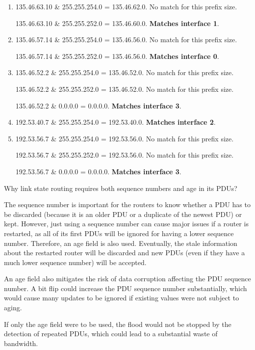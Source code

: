 \begin{Answer}
\begin{enumerate}
\item 135.46.63.10 \& 255.255.254.0 = 135.46.62.0. No match for this prefix size.

135.46.63.10 \& 255.255.252.0 = 135.46.60.0. \textbf{Matches interface 1}.

\item 135.46.57.14 \& 255.255.254.0 = 135.46.56.0. No match for this prefix size.

135.46.57.14 \& 255.255.252.0 = 135.46.56.0. \textbf{Matches interface 0}.

\item 135.46.52.2 \& 255.255.254.0 = 135.46.52.0. No match for this prefix size.

135.46.52.2 \& 255.255.252.0 = 135.46.52.0. No match for this prefix size.

135.46.52.2 \& 0.0.0.0 = 0.0.0.0. \textbf{Matches interface 3}.

\item 192.53.40.7 \& 255.255.254.0 = 192.53.40.0. \textbf{Matches interface 2}.

\item 192.53.56.7 \& 255.255.254.0 = 192.53.56.0. No match for this prefix size.

192.53.56.7 \& 255.255.252.0 = 192.53.56.0. No match for this prefix size.

192.53.56.7 \& 0.0.0.0 = 0.0.0.0. \textbf{Matches interface 3}.
\end{enumerate}
\end{Answer}

\begin{Exercise}
Why link state routing requires both sequence numbers and age in its PDUs?
\end{Exercise}
\begin{Answer}
The sequence number is important for the routers to know whether a PDU has to be discarded (because it is an older PDU or a duplicate of the newest PDU) or kept.
However, just using a sequence number can cause major issues if a router is restarted, as all of its first PDUs will be ignored for having a lower sequence number.
Therefore, an age field is also used. Eventually, the stale information about the restarted router will be discarded and new PDUs (even if they have a much lower sequence number) will be accepted.

An age field also mitigates the risk of data corruption affecting the PDU sequence number. A bit flip could increase the PDU sequence number substantially, which would cause many updates to be ignored if existing values were not subject to aging.

If only the age field were to be used, the flood would not be stopped by the detection of repeated PDUs, which could lead to a substantial waste of bandwidth.
\end{Answer}

